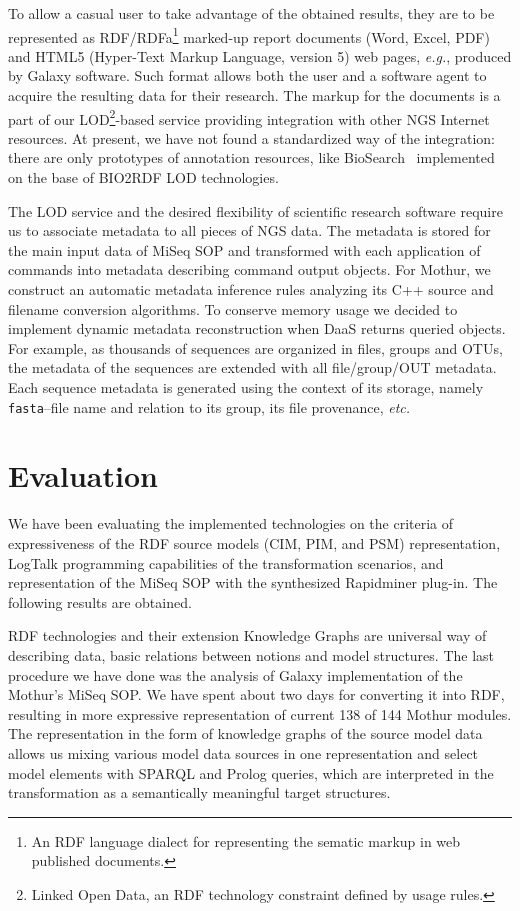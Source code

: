 \documentclass[a4paper]{jpconf}
\begin{document}
To allow a casual user to take advantage of the obtained results, they are to be represented as RDF/RDFa\footnote{An RDF language dialect for representing the sematic markup in web published documents.} marked-up report documents (Word, Excel, PDF) and HTML5 (Hyper-Text Markup Language, version 5) web pages, \emph{e.g.}, produced by Galaxy software.  Such format allows both the user and a software agent to acquire the resulting data for their research.  The markup for the documents is a part of our LOD\footnote{Linked Open Data, an RDF technology constraint defined by usage rules.}-based service providing integration with other NGS Internet resources.  At present, we have not found a standardized way of the integration: there are only prototypes of annotation resources, like BioSearch~\cite{biosearch} implemented on the base of BIO2RDF LOD technologies.

The LOD service and the desired flexibility of scientific research software require us to associate metadata to all pieces of NGS data.  The metadata is stored for the main input data of MiSeq SOP and transformed with each application of commands into metadata describing command output objects.  For Mothur, we construct an automatic metadata inference rules analyzing its C++ source and filename conversion algorithms.  To conserve memory usage we decided to implement dynamic metadata reconstruction when DaaS returns queried objects.  For example, as thousands of sequences are organized in files, groups and OTUs, the metadata of the sequences are extended with all file/group/OUT metadata. Each sequence metadata is generated using the context of its storage, namely \verb|fasta|--file name and relation to its group, its file provenance, \emph{etc.}

\section{Evaluation}\label{sec:eval}

We have been evaluating the implemented technologies on the criteria of expressiveness of the RDF source models (CIM, PIM, and PSM) representation, LogTalk programming capabilities of the transformation scenarios, and representation of the MiSeq SOP with the synthesized Rapidminer plug-in. The following results are obtained.

RDF technologies and their extension Knowledge Graphs are universal way of describing data, basic relations between notions and model structures.  The last procedure we have done was the analysis of Galaxy implementation of the Mothur's MiSeq SOP.  We have spent about two days for converting it into RDF, resulting in more expressive representation of current 138 of 144 Mothur modules.  The representation in the form of knowledge graphs of the source model data allows us mixing various model data sources in one representation and select model elements with SPARQL and Prolog queries, which are interpreted in the transformation as a semantically meaningful target structures.  %
\end{document}
